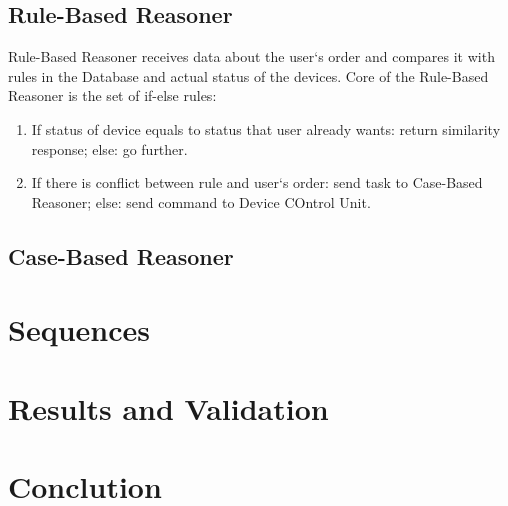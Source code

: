 \documentclass{llncs}
\begin{document}
    \subsection{Rule-Based Reasoner}
    Rule-Based Reasoner receives data about the user`s order and compares it with rules in the Database and actual status of the devices.
    Core of the Rule-Based Reasoner is the set of if-else rules:
    \begin{enumerate}
        \item If status of device equals to status that user already wants: return similarity response; else: go further.
        \item If there is conflict between rule and user`s order: send task to Case-Based Reasoner; else: send command to Device COntrol Unit.
    \end{enumerate}
    \subsection{Case-Based Reasoner}





    \section{Sequences}
    \section{Results and Validation}
    \section{Conclution}
\end{document}

